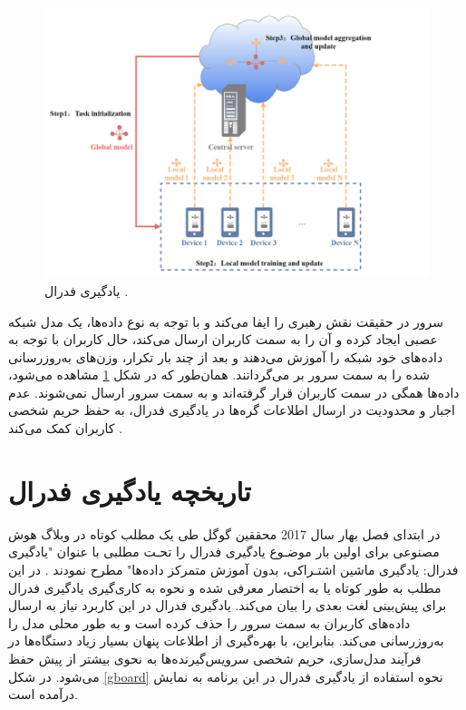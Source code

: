  \begin{figure}[t]
	\centering
	\includegraphics[scale=0.7]{images/chap1/federated_learning.png}%
	\caption{%
		یادگیری فدرال 
		\cite{federated_learning}%
		.
	}
	\label{federated_learning}
	\centering
\end{figure}

سرور در حقیقت نقش رهبری را ایفا می‌کند و با توجه به نوع داده‌ها، یک مدل شبکه عصبی%
ایجاد کرده و آن را به سمت کاربران ارسال می‌کند، حال کاربران با توجه به داده‌های خود شبکه را آموزش می‌دهند و بعد از چند بار تکرار، وزن‌های به‌روزرسانی شده را به سمت سرور بر می‌گردانند. همان‌طور که در شکل
\ref{federated_learning}
مشاهده می‌شود، داده‌ها همگی در سمت کاربران قرار گرفته‌اند و به سمت سرور ارسال نمی‌شوند. عدم اجبار و محدودیت در ارسال اطلاعات گره‌ها در یادگیری فدرال، به حفظ حریم شخصی کاربران کمک می‌کند
\cite{smith2017federated}%
.


\section{تاریخچه یادگیری فدرال}
در ابتدای فصل بهار سال 2017 محققین گوگل
طی یک مطلب کوتاه در وبلاگ هوش مصنوعی برای اولین بار موضـوع یادگیری فدرال را تحـت مطلبی با عنوان "یادگیری فدرال: یادگیری ماشین اشتـراکی، بدون آموزش متمرکز داده‌ها" مطرح نمودند
\cite{mcmahan2017federated}%
. در این مطلب به طور کوتاه
یا به اختصار
معرفی شده و نحوه به کاری‌گیری یادگیری فدرال برای پیش‌بینی لغت بعدی را بیان می‌کند. یادگیری فدرال در این کاربرد نیاز به ارسال داده‌های کاربران به سمت سرور را حذف کرده است و به طور محلی مدل را به‌روزرسانی می‌کند.
بنابراین، با بهره‌گیری از اطلاعات پنهان بسیار زیاد دستگاه‌ها در فرآیند مدل‌سازی، حریم شخصی سرویس‌گیرنده‌ها به نحوی بیشتر از پیش حفظ می‌شود.
در شکل
\ref{gboard}
نحوه استفاده از یادگیری فدرال در این برنامه به نمایش درآمده است.

